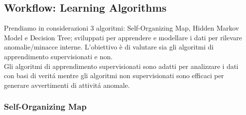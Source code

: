 \documentclass[../tesi.tex]{subfiles}
\begin{document}
\subsection{Workflow: Learning Algorithms}

Prendiamo in considerazioni 3 algoritmi: Self-Organizing Map, Hidden Markov Model e Decision Tree; sviluppati per apprendere e modellare i dati per rilevare anomalie/minacce interne. L’obiettivo è di valutare sia gli algoritmi di apprendimento supervisionati e non.\\
Gli algoritmi di apprendimento supervisionati sono adatti per analizzare i dati con basi di veritá mentre gli algoritmi non supervisionati sono efficaci per generare avvertimenti di attivitá anomale.

\subsubsection{Self-Organizing Map}

\end{document}

